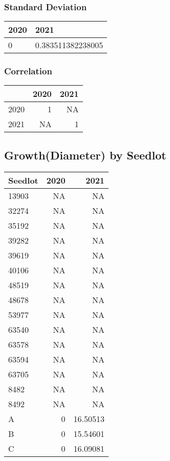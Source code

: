 \documentclass[
]{article}
\begin{document}
\hypertarget{standard-deviation-4}{%
\subsubsection{Standard Deviation}\label{standard-deviation-4}}

\begin{table}[H]
\centering
\begin{tabular}{l|l}
\hline
2020 & 2021\\
\hline
0 & 0.383511382238005\\
\hline
\end{tabular}
\end{table}

\hypertarget{correlation-4}{%
\subsubsection{Correlation}\label{correlation-4}}

\begin{table}[H]
\centering
\begin{tabular}{l|r|r}
\hline
  & 2020 & 2021\\
\hline
2020 & 1 & NA\\
\hline
2021 & NA & 1\\
\hline
\end{tabular}
\end{table}

\hypertarget{growthdiameter-by-seedlot}{%
\subsection{Growth(Diameter) by
Seedlot}\label{growthdiameter-by-seedlot}}

\begin{table}[H]
\centering
\begin{tabular}{l|r|r}
\hline
Seedlot & 2020 & 2021\\
\hline
13903 & NA & NA\\
\hline
32274 & NA & NA\\
\hline
35192 & NA & NA\\
\hline
39282 & NA & NA\\
\hline
39619 & NA & NA\\
\hline
40106 & NA & NA\\
\hline
48519 & NA & NA\\
\hline
48678 & NA & NA\\
\hline
53977 & NA & NA\\
\hline
63540 & NA & NA\\
\hline
63578 & NA & NA\\
\hline
63594 & NA & NA\\
\hline
63705 & NA & NA\\
\hline
8482 & NA & NA\\
\hline
8492 & NA & NA\\
\hline
A & 0 & 16.50513\\
\hline
B & 0 & 15.54601\\
\hline
C & 0 & 16.09081\\
\hline
\end{tabular}
\end{table}
\end{document}
